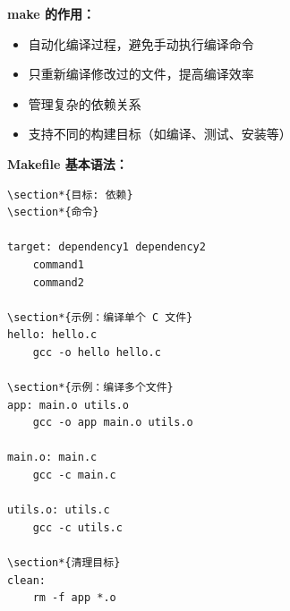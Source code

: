 \documentclass[12pt,UTF8]{ctexbook}
\begin{document}
\textbf{make 的作用：}
\begin{itemize}
    \item 自动化编译过程，避免手动执行编译命令
    \item 只重新编译修改过的文件，提高编译效率
    \item 管理复杂的依赖关系
    \item 支持不同的构建目标（如编译、测试、安装等）
\end{itemize}

\textbf{Makefile 基本语法：}
\begin{verbatim}
\section*{目标: 依赖}
\section*{命令}

target: dependency1 dependency2
	command1
	command2

\section*{示例：编译单个 C 文件}
hello: hello.c
	gcc -o hello hello.c

\section*{示例：编译多个文件}
app: main.o utils.o
	gcc -o app main.o utils.o

main.o: main.c
	gcc -c main.c

utils.o: utils.c
	gcc -c utils.c

\section*{清理目标}
clean:
	rm -f app *.o
\end{verbatim}
\end{document}
